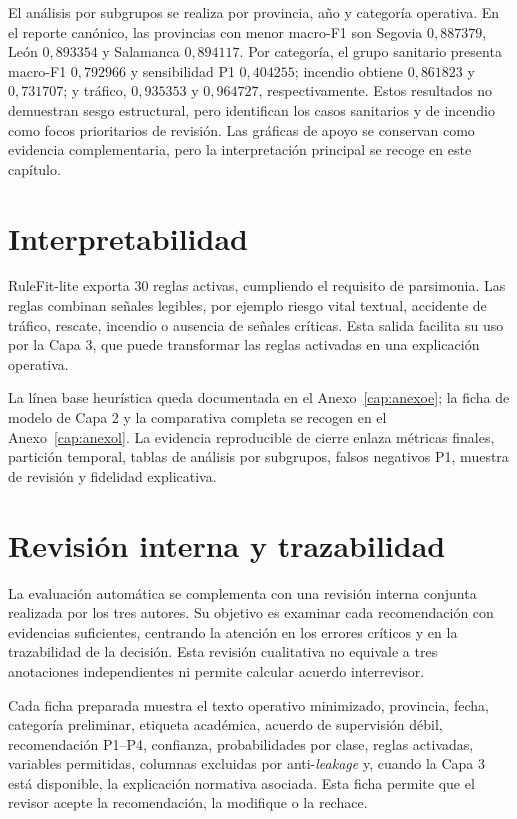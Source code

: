 El análisis por subgrupos se realiza por provincia, año y categoría operativa. En
el reporte canónico, las provincias con menor macro-F1 son Segovia
\(0{,}887379\), León \(0{,}893354\) y Salamanca \(0{,}894117\). Por
categoría, el grupo sanitario presenta macro-F1 \(0{,}792966\) y sensibilidad P1
\(0{,}404255\); incendio obtiene \(0{,}861823\) y \(0{,}731707\); y tráfico,
\(0{,}935353\) y \(0{,}964727\), respectivamente. Estos resultados no demuestran
sesgo estructural, pero identifican los casos sanitarios y de incendio como focos
prioritarios de revisión. Las gráficas de apoyo se conservan como evidencia complementaria, pero la interpretación principal se recoge en este capítulo.

\section{Interpretabilidad}

RuleFit-lite exporta 30 reglas activas, cumpliendo el requisito de parsimonia. Las
reglas combinan señales legibles, por ejemplo riesgo vital textual, accidente de
tráfico, rescate, incendio o ausencia de señales críticas. Esta salida facilita
su uso por la Capa 3, que puede transformar las reglas activadas en una explicación
operativa.

La línea base heurística queda documentada en el Anexo~\ref{cap:anexoe}; la ficha de modelo de
Capa 2 y la comparativa completa se recogen en el Anexo~\ref{cap:anexol}. La evidencia reproducible de cierre enlaza métricas finales, partición temporal, tablas de análisis por subgrupos, falsos negativos P1, muestra de revisión y fidelidad explicativa.

\section{Revisión interna y trazabilidad}

La evaluación automática se complementa con una revisión interna conjunta realizada
por los tres autores. Su objetivo es examinar cada recomendación con evidencias suficientes,
centrando la atención en los errores críticos y en la trazabilidad de la decisión. Esta
revisión cualitativa no equivale a tres anotaciones independientes ni permite calcular
acuerdo interrevisor.

Cada ficha preparada muestra el texto operativo minimizado, provincia, fecha,
categoría preliminar, etiqueta académica, acuerdo de supervisión débil,
recomendación P1--P4, confianza, probabilidades por clase, reglas activadas,
variables permitidas, columnas excluidas por anti-\textit{leakage} y, cuando la Capa 3 está
disponible, la explicación normativa asociada. Esta ficha permite que el revisor acepte
la recomendación, la modifique o la rechace.

